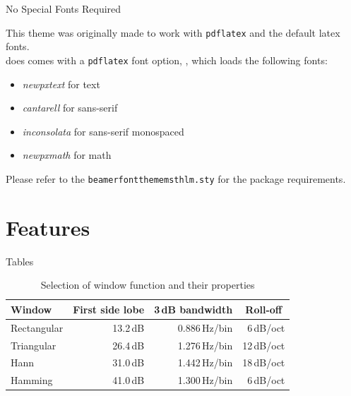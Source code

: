 \documentclass[newPxFont,numfooter,sectionpages]{beamer}
\begin{document}

\begin{frame}[c]{No Special Fonts Required}

This theme was originally made to work with \texttt{pdflatex} and the default latex fonts.\\
\vspace{1em}
 does comes with a \texttt{pdflatex} font option, , which loads the following fonts:

\begin{itemize}
	\item \emph{newpxtext} for text
	\item \emph{cantarell} for sans-serif
	\item \emph{inconsolata} for sans-serif monospaced
	\item \emph{newpxmath} for math
\end{itemize}

Please refer to the \texttt{beamerfontthememsthlm.sty} for the package requirements.

\end{frame}


%
%
\section{Features}


\begin{frame}{Tables}
\begin{table}[]
	\caption{Selection of window function and their properties}
	\begin{tabular}[]{lrrr}
		\toprule
		\textbf{Window}			& \multicolumn{1}{c}{\textbf{First side lobe}}
		                    & \multicolumn{1}{c}{\textbf{3\,dB bandwidth}}
		                    & \multicolumn{1}{c}{\textbf{Roll-off}} \\
		\midrule
		Rectangular				& 13.2\,dB	& 0.886\,Hz/bin	& 6\,dB/oct		\\[0.25em]
		Triangular				& 26.4\,dB	& 1.276\,Hz/bin	& 12\,dB/oct	\\[0.25em]
		Hann					& 31.0\,dB	& 1.442\,Hz/bin	& 18\,dB/oct	\\[0.25em]
		Hamming					& 41.0\,dB	& 1.300\,Hz/bin	& 6\,dB/oct		\\
		\bottomrule
	\end{tabular}
	\label{tab:WindowFunctions}
\end{table}
\end{frame}
\end{document}
